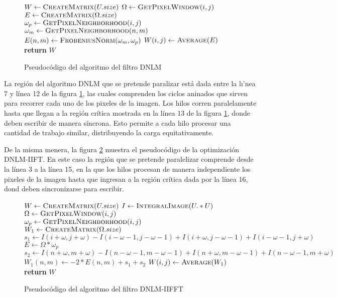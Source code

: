 \begin{figure}
\begin{algorithmic}[1]
\State $W\gets \Call{CreateMatrix}{U.size}$
		\State $\Omega\gets \Call{GetPixelWindow}{i,j}$
        \State $E\gets \Call{CreateMatrix}{\Omega.size}$
        \State $\omega_{p}\gets \Call{GetPixelNeighborhood}{i,j}$
        		\State $\omega_{m}\gets \Call{GetPixelNeighborhood}{n,m}$
                \State $E(n,m)\gets \Call{FrobeniusNorm}{\omega_m,\omega_p}$              
        	\EndFor 
        \EndFor 
        \State $W(i,j)\gets \Call{Average}{E}$
	\EndFor
\EndFor
\State \textbf{return} $W$
\end{algorithmic}
\caption{Pseudoc\'odigo del algoritmo del filtro DNLM\label{fig:euclid}}
\end{figure}

La regi\'on del algoritmo DNLM que se pretende paralizar est\'a dada entre la l\i'nea 7 y l\'inea 12 de la figura \ref{fig:euclid}, las cuales comprenden los ciclos aninados que sirven para recorrer cada uno de los pixeles de la imagen. Los hilos corren paralelamente hasta que llegan a la regi\'on cr\'itica mostrada en la l\'inea 13 de la figura \ref{fig:euclid}, donde deben escribir de manera s\'incrona. Esto permite a cada hilo procesar una cantidad de trabajo similar, distribuyendo la carga equitativamente.

De la misma menera, la figura \ref{fig:euclid2} muestra el pseudoc\'odigo de la optimizaci\'on DNLM-IIFT. En este caso la regi\'on que se pretende paralelizar comprende desde la l\'inea 3 a la l\'inea 15, en la que los hilos procesan de manera independiente los pixeles de la imagen hasta que ingresan a la regi\'on cr\'itica dada por la l\'inea 16, dond deben sincronizarse para escribir.

\begin{figure}

\begin{algorithmic}[1]
\State $W\gets \Call{CreateMatrix}{U.size}$
\State $I\gets \Call{IntegralImage}{U.*U}$
		\State $\Omega\gets \Call{GetPixelWindow}{i,j}$
        \State $\omega_{p}\gets \Call{GetPixelNeighborhood}{i,j}$
        \State $W_{1}\gets \Call{CreateMatrix}{\Omega.size}$
        \State $s_{1} \gets I(i+\omega,j+\omega)-I(i-\omega-1,j-\omega-1)+I(i+\omega,j-\omega-1)+I(i-\omega-1,j+\omega)$
        \State $E\gets \Omega * \omega_{p}$ 
        		\State $s_{2} \gets I(n+\omega,m+\omega)-I(n-\omega-1,m-\omega-1)+I(n+\omega,m-\omega-1)+I(n-\omega-1,m+\omega)$
        		\State $W_{1}(n,m)\gets -2*E(n,m) + s_{1} + s_{2}$
        	\EndFor 
        \EndFor 
        \State $W(i,j)\gets \Call{Average}{W_{1}}$
	\EndFor
\EndFor
\State \textbf{return} $W$
\end{algorithmic}
\caption{Pseudoc\'odigo del algoritmo del filtro DNLM-IIFFT}\label{fig:euclid2}
\end{figure}

